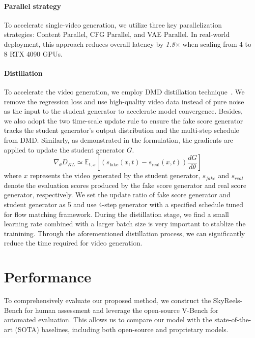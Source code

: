 \documentclass{article}
\begin{document}
{\paragraph{Parallel strategy} To accelerate single-video generation, we utilize three key parallelization strategies: Content Parallel, CFG Parallel, and VAE Parallel. In real-world deployment, this approach reduces overall latency by \emph{1.8$\times$} when scaling from 4 to 8 RTX 4090 GPUs. 
\paragraph{Distillation} To accelerate the video generation, we employ DMD distillation technique~\cite{yin2024onestepdiffusiondistributionmatching,yin2024improveddistributionmatchingdistillation}. We remove the regression loss and use high-quality video data instead of pure noise as the input to the student generator to accelerate model convergence. Besides, we also adopt the two time-scale update rule to ensure the fake score generator tracks the student generator's output distribution and the multi-step schedule from DMD. Similarly, as demonstrated in the formulation, the gradients are applied to update the student generator $G$. 
\begin{equation*}
\nabla_{\theta} D_{KL} \simeq \mathbb{E}_{t,x} \left[\left( s_{\text{fake}}(x,t) - s_{\text{real}}(x,t) \right) \frac{dG}{d\theta} \right]
\end{equation*}
where $x$ represents the video generated by the student generator, $s_{fake}$ and $s_{real}$ denote the evaluation scores produced by the fake score generator and real score generator, respectively. We set the update ratio of fake score generator and student generator as 5 and use 4-step generator with a specified schedule tuned for flow matching framework. During the distillation stage, we find a small learning rate combined with a larger batch size is very important to stablize the trainining. Through the aforementioned distillation process, we can significantly reduce the time required for video generation.


\section{Performance}
\label{subsec:performance}
To comprehensively evaluate our proposed method, we construct the SkyReels-Bench for human assessment and leverage the open-source V-Bench for automated evaluation. This allows us to compare our model with the state-of-the-art (SOTA) baselines, including both open-source and proprietary models.

}
\end{document}

